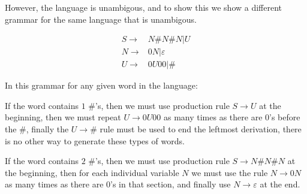 However, the language is unambigous, and to show this we show a different grammar for the same language that is unambigous.

\begin{align*}
S \rightarrow& N\#N\#N|U \\
N \rightarrow& 0N|\varepsilon \\
U \rightarrow& 0U00|\#
\end{align*}

In this grammar for any given word in the language:

If the word contains $1$ $\#$'s, then we must use production rule $S \rightarrow U$ at the beginning, then we must repeat $U \rightarrow 0U00$ as many times as there are $0$'s before the $\#$, finally the $U \rightarrow \#$ rule must be used to end the leftmost derivation, there is no other way to generate these types of words.

If the word contains $2$ $\#$'s, then we must use production rule $S \rightarrow N\#N\#N$ at the beginning, then for each individual variable $N$ we must use the rule $N \rightarrow 0N$ as many times as there are $0$'s in that section, and finally use $N \rightarrow \varepsilon$ at the end.
